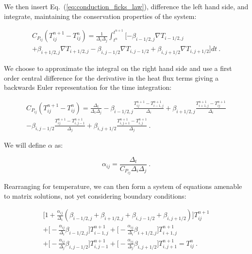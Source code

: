 \documentclass[letterpaper,12pt]{article}
\begin{document}
We then insert Eq.~(\ref{eq:conduction_ficks_law}), difference the
left hand side, and integrate, maintaining the conservation properties
of the system:

\begin{multline}
  C_{P_{ij}} ( T^{n+1}_{ij} - T^n_{ij} ) = \frac{1}{\Delta_i \Delta_j}
  \int_{t^n}^{t^{n+1}} [ -\beta_{i-1/2,j} \nabla T_{i-1/2,j}\\
    + \beta_{i+1/2,j} \nabla T_{i+1/2,j} - \beta_{i,j-1/2} \nabla
    T_{i,j-1/2} +\beta_{i,j+1/2} \nabla T_{i,j+1/2} ] dt\:.
  \label{eq:conduction_time_integral}
\end{multline}

We choose to approximate the integral on the right hand side and use a
first order central difference for the derivative in the heat flux
terms giving a backwards Euler representation for the time
integration:

\begin{multline}
  C_{P_{ij}}( T^{n+1}_{ij} - T^n_{ij} ) = \frac{\Delta_t}{\Delta_i
    \Delta_j} -\beta_{i-1/2,j} \frac{T^{n+1}_{ij}
    -T^{n+1}_{i-1,j}}{\Delta_i} +\beta_{i+1/2,j} \frac{T^{n+1}_{i+1,j}
    -T^{n+1}_{ij}}{\Delta_i}\\
  -\beta_{i,j-1/2} \frac{T^{n+1}_{ij}
    -T^{n+1}_{i,j-1}}{\Delta_j} +\beta_{i,j+1/2} \frac{T^{n+1}_{i,j+1}
    -T^{n+1}_{i,j}}{\Delta_j}\:.
  \label{eq:conduction_fv_multline}
\end{multline}

We will define $\alpha$ as:

\begin{equation}
  \alpha_{ij} = \frac{\Delta_t}{C_{P_{ij}} \Delta_i \Delta_j}
  \label{eq:conduction_coeff}\:.
\end{equation}

Rearranging for temperature, we can then form a system of equations
amenable to matrix solutions, not yet considering boundary conditions:

\begin{multline}
 \Big[1 + \frac{\alpha_{ij}}{\Delta_i}(\beta_{i-1/2,j} +
   \beta_{i+1/2,j} + \beta_{i,j-1/2} + \beta_{i,j+1/2})\Big]
 T^{n+1}_{ij} \\
 + \Big[-\frac{\alpha_{ij}}{\Delta_i}
   \beta_{i-1/2,j}\Big] T^{n+1}_{i-1,j}
 + \Big[-\frac{\alpha_{ij}}{\Delta_i} \beta_{i+1/2,j}\Big]
 T^{n+1}_{i+1,j} \\
 + \Big[-\frac{\alpha_{ij}}{\Delta_j}
   \beta_{i,j-1/2}\Big] T^{n+1}_{i,j-1} +
 \Big[-\frac{\alpha_{ij}}{\Delta_j} \beta_{i,j+1/2}\Big]
 T^{n+1}_{i,j+1} = T^n_{ij}\:.
 \label{eq:conduction_inner_terms}
\end{multline}
\end{document}
